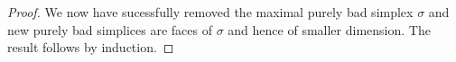 \begin{proof}
	We now have sucessfully removed the maximal purely bad simplex $\sigma$ and new purely bad simplices are faces of $\sigma$ and hence of smaller dimension.
	The result follows by induction.
\end{proof}